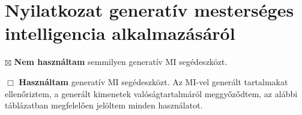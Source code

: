 \section{Nyilatkozat generatív mesterséges intelligencia alkalmazásáról}

\noindent $\boxtimes$ \textbf{Nem használtam} semmilyen generatív MI segédeszközt.

\noindent $\Box$ \textbf{Használtam} generatív MI segédeszközt. Az MI-vel generált tartalmakat ellenőriztem, a generált kimenetek valóságtartalmáról meggyőződtem, az alábbi táblázatban megfelelően jelöltem minden használatot.


